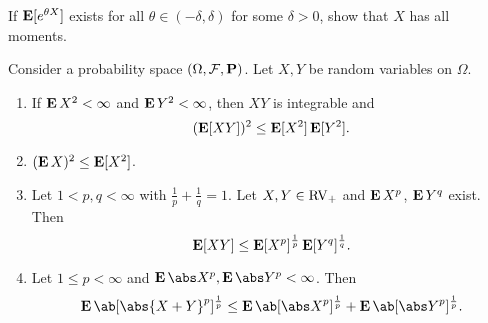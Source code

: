 \begin{exercise}
    If $\operatorname{\mathbf E}[e^{\theta X}]$ exists for all $\theta \in (-\delta, \delta)$
    for some $\delta > 0$, show that $X$ has all moments.
\end{exercise}

\begin{theorem*}[inequalities] \label{thm:exp:ineq}
    Consider a probability space $(\Omega, \mathcal F, \operatorname{\mathbf P})$.
    Let $X, Y$ be random variables on $\Omega$.
    \begin{enumerate}
        \item \label{thm:exp:cs}
        If $\operatorname{\mathbf E} X^2 < \infty$ and $\operatorname{\mathbf E} Y^2 < \infty$, then $XY$ is
        integrable and \[
            (\operatorname{\mathbf E}[XY])^2 \le \operatorname{\mathbf E}[X^2] \operatorname{\mathbf E}[Y^2].
        \]
        \item \label{thm:exp:var}
        $(\operatorname{\mathbf E} X)^2 \le \operatorname{\mathbf E}[X^2]$.
        \item \label{thm:exp:holder}
        Let $1 < p, q < \infty$ with $\frac1p + \frac1q = 1$.
        Let $X, Y \in \operatorname{RV}_+$ and $\operatorname{\mathbf E} X^p$, $\operatorname{\mathbf E} Y^q$ exist.
        Then \[
            \operatorname{\mathbf E}[XY] \le \operatorname{\mathbf E}[X^p]^{\frac1p} \operatorname{\mathbf E}[Y^q]^{\frac1q}.
        \]
        \item \label{thm:exp:minkowski}
        Let $1 \le p < \infty$ and $\E \abs X^p, \E \abs Y^p < \infty$.
        Then \[
            \E\ab[{\abs{X + Y}}^p]^{\frac1p}
                \le \E\ab[{\abs X}^p]^{\frac1p}
                + \E\ab[{\abs Y}^p]^{\frac1p}.
        \]
    \end{enumerate}
\end{theorem*}
